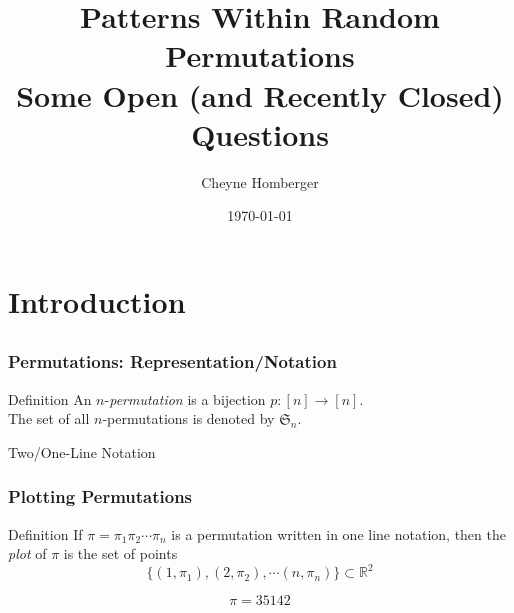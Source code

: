 \documentclass[xcolor=dvipsnames]{beamer}
\newcommand{\ra}{\rightarrow}
\renewcommand{\S}{\mathfrak{S}}
\begin{document}
\title[Patterns in Permutations]%
  {\rmfamily \Large Patterns Within Random Permutations \\
  \normalsize Some Open (and Recently Closed) Questions}

\author{Cheyne Homberger}
\date{\today}

\begin{frame}
  \titlepage
\end{frame}

\section{Introduction}
\subsection{}


\begin{frame} \frametitle{Permutations: Representation/Notation}
  \begin{block}{Definition}
    An $n$-\emph{permutation} is a bijection $p:[n] \ra [n]$. \\
    The set of all $n$-permutations is denoted by $\S_n$. 
  \end{block}

  \vspace{1pc}

    
  \begin{center}
  \begin{block}{Two/One-Line Notation}
  \end{block}
  \end{center}


\end{frame}


\begin{frame} \frametitle{Plotting Permutations}

  \begin{block}{Definition}
    If $\pi = \pi_1 \pi_2 \cdots \pi_n$ is a permutation written in one line
    notation, then the \emph{plot} of $\pi$ is the set of points 
    $$ \{ (1, \pi_1), (2, \pi_2), \cdots (n, \pi_n) \} \subset \mathbb{R}^2 $$
  \end{block}

  \pause 
  \begin{center}
  \end{center}
  $$ \pi = 35142 $$

\end{frame}
\end{document}
